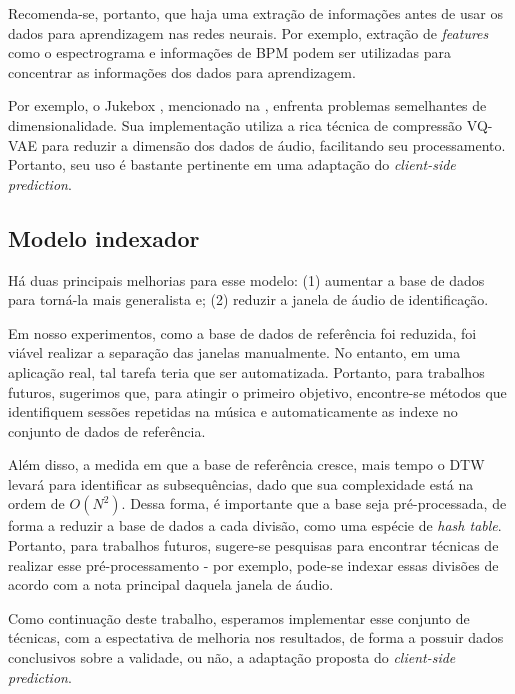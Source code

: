 Recomenda-se, portanto, que haja uma extração de informações antes de usar os dados para aprendizagem nas redes neurais. Por exemplo, extração de \textit{features} como o espectrograma e informações de BPM podem ser utilizadas para concentrar as informações dos dados para aprendizagem.

Por exemplo, o Jukebox \cite{jukebox}, mencionado na , enfrenta problemas semelhantes de dimensionalidade. Sua implementação utiliza a rica técnica de compressão VQ-VAE \cite{vq-vae} para reduzir a dimensão dos dados de áudio, facilitando seu processamento. Portanto, seu uso é bastante pertinente em uma adaptação do \textit{client-side prediction}.

\subsection{Modelo indexador}

Há duas principais melhorias para esse modelo: (1) aumentar a base de dados para torná-la mais generalista e; (2) reduzir a janela de áudio de identificação.

Em nosso experimentos, como a base de dados de referência foi reduzida, foi viável realizar a separação das janelas manualmente. No entanto, em uma aplicação real, tal tarefa teria que ser automatizada. Portanto, para trabalhos futuros, sugerimos que, para atingir o primeiro objetivo, encontre-se métodos que identifiquem sessões repetidas na música e automaticamente as indexe no conjunto de dados de referência.

Além disso, a medida em que a base de referência cresce, mais tempo o DTW levará para identificar as subsequências, dado que sua complexidade está na ordem de $O(N^2)$. Dessa forma, é importante que a base seja pré-processada, de forma a reduzir a base de dados a cada divisão, como uma espécie de \textit{hash table}. Portanto, para trabalhos futuros, sugere-se pesquisas para encontrar técnicas de realizar esse pré-processamento - por exemplo, pode-se indexar essas divisões de acordo com a nota principal daquela janela de áudio.

Como continuação deste trabalho, esperamos implementar esse conjunto de técnicas, com a espectativa de melhoria nos resultados, de forma a possuir dados conclusivos sobre a validade, ou não, a adaptação proposta do \textit{client-side prediction}.